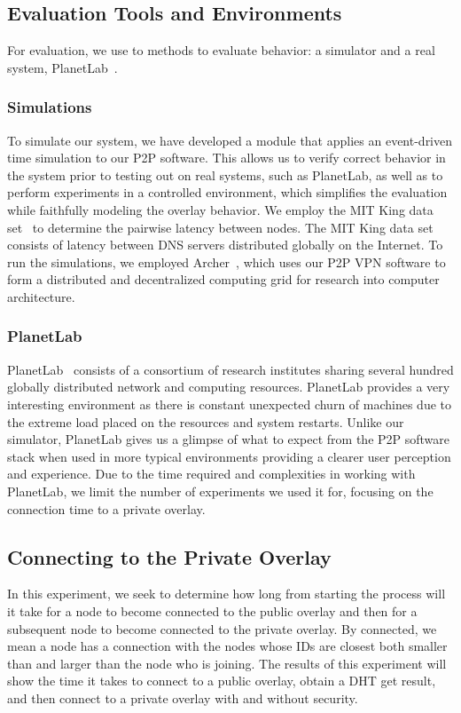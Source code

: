 \documentclass[conference]{IEEEtran}
\begin{document}
\subsection{Evaluation Tools and Environments}
For evaluation, we use to methods to evaluate behavior:  a simulator and a real
system, PlanetLab~\cite{planetlab}.

\subsubsection{Simulations}
To simulate our system, we have developed a module that applies an event-driven
time simulation to our P2P software.  This allows us to verify correct behavior
in the system prior to testing out on real systems, such as PlanetLab, as well
as to perform experiments in a controlled environment, which simplifies the
evaluation while faithfully modeling the overlay behavior.  We employ the MIT
King data set~\cite{king_data} to determine the pairwise latency between nodes.
The MIT King data set consists of latency between DNS servers distributed
globally on the Internet.  To run the simulations, we employed
Archer~\cite{archer}, which uses our P2P VPN software to form a distributed and
decentralized computing grid for research into computer architecture.

\subsubsection{PlanetLab}
PlanetLab~\cite{planetlab} consists of a consortium of research institutes sharing
several hundred globally distributed network and computing resources.  PlanetLab
provides a very interesting environment as there is constant unexpected churn
of machines due to the extreme load placed on the resources and system restarts.
Unlike our simulator, PlanetLab gives us a glimpse of what to expect from the
P2P software stack when used in more typical environments providing a clearer
user perception and experience.  Due to the time required and complexities in
working with PlanetLab, we limit the number of experiments we used it for,
focusing on the connection time to a private overlay.

\subsection{Connecting to the Private Overlay}
In this experiment, we seek to determine how long from starting the process will
it take for a node to become connected to the public overlay and then for a
subsequent node to become connected to the private overlay.  By connected, we
mean a node has a connection with the nodes whose IDs are closest both smaller
than and larger than the node who is joining.  The results of this experiment
will show the time it takes to connect to a public overlay, obtain a DHT get
result, and then connect to a private overlay with and without security.
\end{document}
